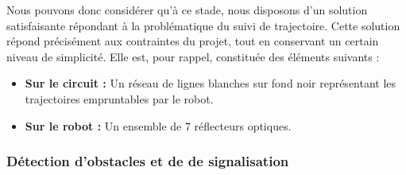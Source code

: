 		Nous pouvons donc considérer qu'à ce stade, nous disposons d'un solution satisfaisante répondant à la problématique du suivi de trajectoire.
		Cette solution répond précisément aux contraintes du projet, tout en conservant un certain niveau de simplicité. Elle est, pour rappel, constituée des éléments suivants :\\

		\begin{itemize}
			\item \textbf{Sur le circuit :} Un réseau de lignes blanches sur fond noir représentant les trajectoires empruntables par le robot.
			\item \textbf{Sur le robot :} Un ensemble de 7 réflecteurs optiques.
		\end{itemize}

	\subsubsection{Détection d'obstacles et de de signalisation}

